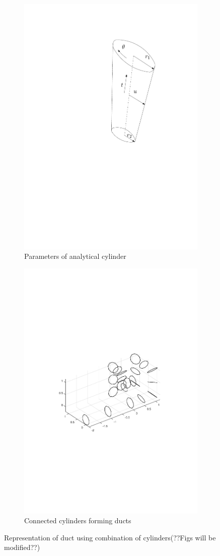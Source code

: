 \documentclass[12pt,a4]{article}
\begin{document}
\begin{figure}[ht!]
    \centering
    \begin{subfigure}{0.48\textwidth}
        \centering
        \includegraphics[width=0.3\linewidth]{figures/fig17a.pdf}
        \caption{Parameters of analytical cylinder \label{fig:cylparams}}
    \end{subfigure}%
    \begin{subfigure}{0.48\textwidth}
        \centering
        \includegraphics[width=0.75\linewidth]{figures/fig16.pdf}
        \caption{Connected cylinders forming ducts \label{fig:cylductmotion}}
    \end{subfigure}
    \caption{ Representation of duct using combination of cylinders(??Figs will be modified??)}
\end{figure}
\end{document}
